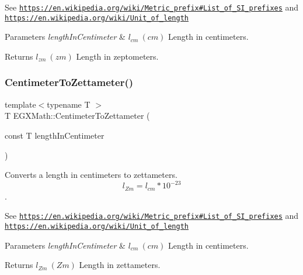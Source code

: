 See \href{https://en.wikipedia.org/wiki/Metric_prefix#List_of_SI_prefixes}{\tt https\+://en.\+wikipedia.\+org/wiki/\+Metric\+\_\+prefix\#\+List\+\_\+of\+\_\+\+S\+I\+\_\+prefixes} and \href{https://en.wikipedia.org/wiki/Unit_of_length}{\tt https\+://en.\+wikipedia.\+org/wiki/\+Unit\+\_\+of\+\_\+length} 
\begin{DoxyParams}{Parameters}
{\em length\+In\+Centimeter} & $ l_{cm}\ (cm)$ Length in centimeters. \\
\hline
\end{DoxyParams}
\begin{DoxyReturn}{Returns}
$ l_{zm}\ (zm)$ Length in zeptometers. 
\end{DoxyReturn}
\mbox{\label{group___e_g_x_math-_conversions-_length_conversions-_centimeter-_s_i_ga20ad80d764e7cc6f34245fe2ab4e7772}} 
\subsubsection{\texorpdfstring{Centimeter\+To\+Zettameter()}{CentimeterToZettameter()}}
{\footnotesize\ttfamily template$<$typename T $>$ \\
T E\+G\+X\+Math\+::\+Centimeter\+To\+Zettameter (\begin{DoxyParamCaption}\item[{const T}]{length\+In\+Centimeter }\end{DoxyParamCaption})}



Converts a length in centimeters to zettameters. \[ l_{Zm}=l_{cm} * 10^{-23} \]. 

See \href{https://en.wikipedia.org/wiki/Metric_prefix#List_of_SI_prefixes}{\tt https\+://en.\+wikipedia.\+org/wiki/\+Metric\+\_\+prefix\#\+List\+\_\+of\+\_\+\+S\+I\+\_\+prefixes} and \href{https://en.wikipedia.org/wiki/Unit_of_length}{\tt https\+://en.\+wikipedia.\+org/wiki/\+Unit\+\_\+of\+\_\+length} 
\begin{DoxyParams}{Parameters}
{\em length\+In\+Centimeter} & $ l_{cm}\ (cm)$ Length in centimeters. \\
\hline
\end{DoxyParams}
\begin{DoxyReturn}{Returns}
$ l_{Zm}\ (Zm)$ Length in zettameters. 
\end{DoxyReturn}
